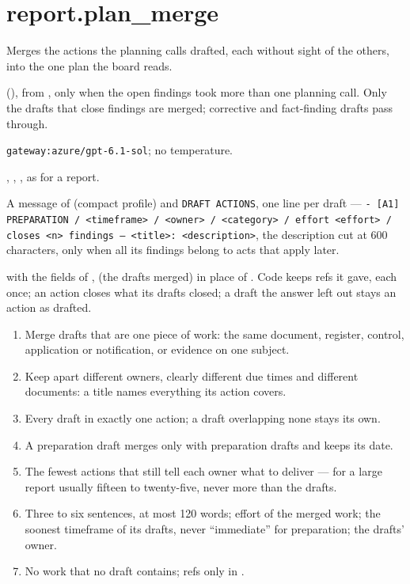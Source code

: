 \section{report.plan\_merge}\label{sec:aprompts:report-plan_merge}

 Merges the actions the planning calls drafted, each without sight of
the others, into the one plan the board reads.

  (), from
, only when the open findings took more than one planning call. Only
the drafts that close findings are merged; corrective and fact-finding drafts pass through.

 \texttt{gateway:azure/gpt-6.1-sol}; no temperature.

 , , , as for a
report.

 A message of  (compact profile) and
\texttt{DRAFT ACTIONS}, one line per draft --- \texttt{- [A1] PREPARATION / <timeframe> / <owner> / <category> / effort <effort> / closes <n> findings — <title>: <description>}, the description
cut at 600 characters,  only when all its findings belong to acts that apply
later.

  with the fields of
,  (the drafts merged) in place of
. Code keeps refs it gave, each once; an action closes what its drafts
closed; a draft the answer left out stays an action as drafted.

\begin{enumerate}[itemsep=1pt, topsep=3pt]
  \item Merge drafts that are one piece of work: the same document, register, control,
    application or notification, or evidence on one subject.
  \item Keep apart different owners, clearly different due times and different documents: a
    title names everything its action covers.
  \item Every draft in exactly one action; a draft overlapping none stays its own.
  \item A preparation draft merges only with preparation drafts and keeps its date.
  \item The fewest actions that still tell each owner what to deliver --- for a large report
    usually fifteen to twenty-five, never more than the drafts.
  \item Three to six sentences, at most 120 words; effort of the merged work; the soonest
    timeframe of its drafts, never \enquote{immediate} for preparation; the drafts' owner.
  \item No work that no draft contains; refs only in .
\end{enumerate}

